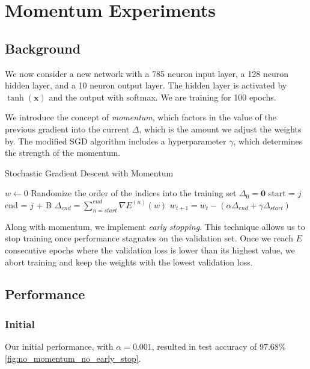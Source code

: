 \section{Momentum Experiments}

\subsection{Background}

We now consider a new network with a 785 neuron input layer, a 128 neuron
hidden layer, and a 10 neuron output layer. The hidden layer is activated by
$\tanh(\mathbf x)$ and the output with softmax. We are training for 100 epochs.

We introduce the concept of \textit{momentum}, which factors in the value of the
previous gradient into the current $\Delta$, which is the amount we adjust the weights by.
The modified SGD algorithm includes a hyperparameter $\gamma$, which determines the strength
of the momentum.

\begin{algorithm}
	\caption{Stochastic Gradient Descent with Momentum}
	\begin{algorithmic}
		\State $w \gets 0$
		\State Randomize the order of the indices into the training set
		\State $\Delta_{0} = \mathbf 0$
		\State start = $j$
		\State end = $j$ + B
		\State $\Delta_{end} = \sum_{n = start}^{end} \nabla E^{(n)}(w)$
		\State $w_{t + 1} = w_t - (\alpha \Delta_{end} + \gamma \Delta_{start})$
		\EndFor
		\EndFor
	\end{algorithmic}
\end{algorithm}


Along with momentum, we implement \textit{early stopping}. This technique allows us
to stop training once performance stagnates on the validation set. Once  we reach
$E$ consecutive epochs where the validation loss is lower than its highest value, we
abort training and keep the weights with the lowest validation loss.


\subsection{Performance}

\subsubsection{Initial}

Our initial performance, with $\alpha = 0.001$, resulted in test accuracy of $97.68\%$\cref{fig:no_momentum_no_early_stop}.

